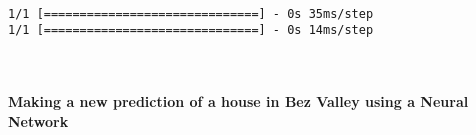     \begin{center}
    \end{center}
    { \hspace*{\fill} \\}
    
    \begin{Verbatim}[commandchars=\\\{\}]
1/1 [==============================] - 0s 35ms/step
1/1 [==============================] - 0s 14ms/step
    \end{Verbatim}

    \begin{center}
    \end{center}
    { \hspace*{\fill} \\}
    
    \hypertarget{making-a-new-prediction-of-a-house-in-bez-valley-using-a-neural-network}{%
\paragraph{Making a new prediction of a house in Bez Valley using a
Neural
Network}\label{making-a-new-prediction-of-a-house-in-bez-valley-using-a-neural-network}}

